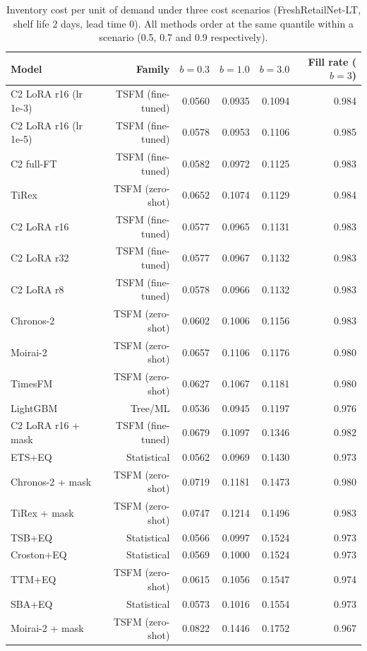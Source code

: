 \begin{table}[t]
\centering
\small
\caption{Inventory cost per unit of demand under three cost scenarios (FreshRetailNet-LT, shelf life 2 days, lead time 0). All methods order at the same quantile within a scenario (0.5, 0.7 and 0.9 respectively).}
\label{tab:table6_inventory}
\begin{tabular}{lrrrrr}
\toprule
Model & Family & $b=0.3$ & $b=1.0$ & $b=3.0$ & Fill rate ($b=3$) \\
\midrule
C2 LoRA r16 (lr 1e-3) & TSFM (fine-tuned) & 0.0560 & 0.0935 & 0.1094 & 0.984 \\
C2 LoRA r16 (lr 1e-5) & TSFM (fine-tuned) & 0.0578 & 0.0953 & 0.1106 & 0.985 \\
C2 full-FT & TSFM (fine-tuned) & 0.0582 & 0.0972 & 0.1125 & 0.983 \\
TiRex & TSFM (zero-shot) & 0.0652 & 0.1074 & 0.1129 & 0.984 \\
C2 LoRA r16 & TSFM (fine-tuned) & 0.0577 & 0.0965 & 0.1131 & 0.983 \\
C2 LoRA r32 & TSFM (fine-tuned) & 0.0577 & 0.0967 & 0.1132 & 0.983 \\
C2 LoRA r8 & TSFM (fine-tuned) & 0.0578 & 0.0966 & 0.1132 & 0.983 \\
Chronos-2 & TSFM (zero-shot) & 0.0602 & 0.1006 & 0.1156 & 0.983 \\
Moirai-2 & TSFM (zero-shot) & 0.0657 & 0.1106 & 0.1176 & 0.980 \\
TimesFM & TSFM (zero-shot) & 0.0627 & 0.1067 & 0.1181 & 0.980 \\
LightGBM & Tree/ML & 0.0536 & 0.0945 & 0.1197 & 0.976 \\
C2 LoRA r16 + mask & TSFM (fine-tuned) & 0.0679 & 0.1097 & 0.1346 & 0.982 \\
ETS+EQ & Statistical & 0.0562 & 0.0969 & 0.1430 & 0.973 \\
Chronos-2 + mask & TSFM (zero-shot) & 0.0719 & 0.1181 & 0.1473 & 0.980 \\
TiRex + mask & TSFM (zero-shot) & 0.0747 & 0.1214 & 0.1496 & 0.983 \\
TSB+EQ & Statistical & 0.0566 & 0.0997 & 0.1524 & 0.973 \\
Croston+EQ & Statistical & 0.0569 & 0.1000 & 0.1524 & 0.973 \\
TTM+EQ & TSFM (zero-shot) & 0.0615 & 0.1056 & 0.1547 & 0.974 \\
SBA+EQ & Statistical & 0.0573 & 0.1016 & 0.1554 & 0.973 \\
Moirai-2 + mask & TSFM (zero-shot) & 0.0822 & 0.1446 & 0.1752 & 0.967 \\

\end{tabular}
\end{table}
